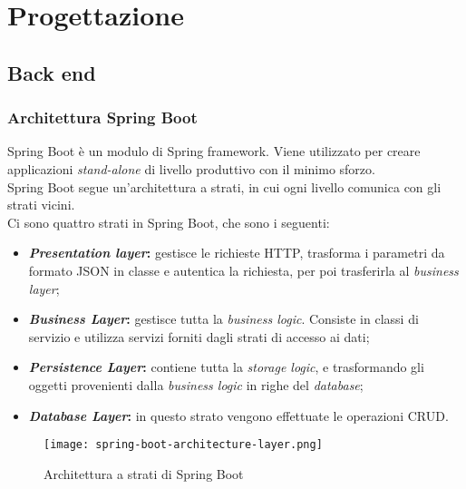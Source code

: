 \section{Progettazione}
\label{sec:progettazione}

\subsection{Back end}
\subsubsection{Architettura Spring Boot}
Spring Boot è un modulo di Spring \gls{framework}. Viene utilizzato per creare applicazioni \textit{stand-alone} di livello produttivo con il minimo sforzo.\\
Spring Boot segue un'architettura a strati, in cui ogni livello comunica con gli strati vicini.\\
Ci sono quattro strati in Spring Boot, che sono i seguenti:
\begin{itemize}
    \item \textbf{\textit{Presentation layer}:} gestisce le richieste HTTP, trasforma i parametri da formato JSON in classe e autentica la richiesta, per poi trasferirla al \textit{business layer};
    \item \textbf{\textit{Business Layer}:} gestisce tutta la \textit{business logic}. Consiste in classi di servizio e utilizza servizi forniti dagli strati di accesso ai dati;
    \item \textbf{\textit{Persistence Layer}:} contiene tutta la \textit{storage logic}, e trasformando gli oggetti provenienti dalla \textit{business logic} in righe del \textit{database};
    \item \textbf{\textit{Database Layer}:} in questo strato vengono effettuate le operazioni \gls{CRUD}.
\end{itemize}
\begin{figure}[H] 
    \centering 
    \texttt{[image: spring-boot-architecture-layer.png]} 
    \caption{Architettura a strati di Spring Boot}
\end{figure}

